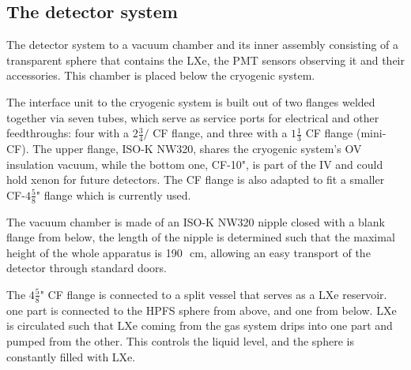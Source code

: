 \subsection{The detector system}
\label{subsec:det}
 
The detector system  to a vacuum chamber and its inner assembly consisting of a transparent sphere that 
contains the LXe, the PMT sensors observing it and their accessories. This chamber is placed below the cryogenic system. 



The interface unit to the cryogenic system is built out of two flanges welded together via seven tubes, which serve as service ports for electrical and other feedthroughs: four 
with a $2 \frac{3}{4}/$ CF flange, and three with a $1\frac{1}{3}$ CF flange (mini-CF). 
The upper flange, ISO-K NW320, shares the cryogenic system's OV insulation vacuum, while the bottom one, CF-10", is part of the IV and could hold xenon for future detectors. 
The CF flange is also adapted to fit a smaller CF-$4\frac{5}{8}$" flange which is currently used.

The vacuum chamber is made of an ISO-K NW320 nipple closed with a blank flange from below, 
the length of the nipple is determined such that the maximal height of the whole 
apparatus is 190~\,cm, allowing an easy transport of the detector through standard doors.
 
The $4\frac{5}{8}$" CF flange is connected to a split vessel that serves as a LXe reservoir. one part is connected 
to the HPFS sphere from above, and one from below. LXe is circulated such that LXe coming from the gas system drips into one part and pumped from the other. This controls the liquid level, and the sphere is constantly filled with LXe. 



